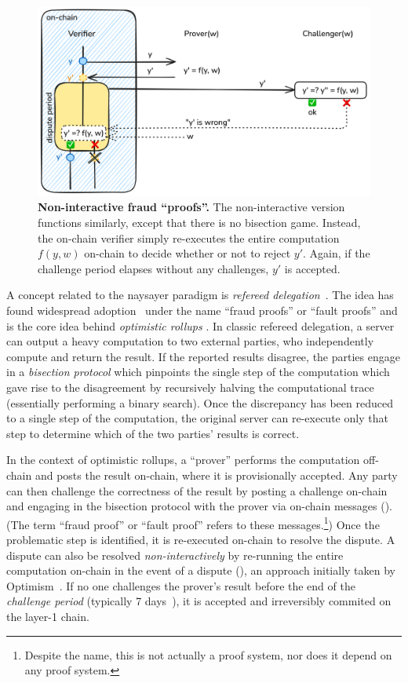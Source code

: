  \begin{figure}[tbh]
    \includegraphics[width=\textwidth]{naysayer/figs/fraud-NI.png}
    \caption{\textbf{Non-interactive fraud ``proofs''.} The non-interactive version functions similarly, except that there is no bisection game. Instead, the on-chain verifier simply re-executes the entire computation $f(y, w)$ on-chain to decide whether or not to reject $y'$. Again, if the challenge period elapses without any challenges, $y'$ is accepted.}
    \label{fig:fraud-NI}
 \end{figure}

A concept related to the naysayer paradigm is \emph{refereed delegation}~\cite{STOC:FeiKil97}. The idea has found widespread adoption~\cite{ARXIV:TeuRei19,USENIX:KGCWF18} under the name ``fraud proofs'' or ``fault proofs'' and is the core idea behind \emph{optimistic rollups} \cite{ethereum_optimistic,arbitrum_nitro,optimism_rollup}. In classic refereed delegation, a server can output a heavy computation to two external parties, who independently compute and return the result. If the reported results disagree, the parties engage in a \emph{bisection protocol} which pinpoints the single step of the computation which gave rise to the disagreement by recursively halving the computational trace (essentially performing a binary search). Once the discrepancy has been reduced to a single step of the computation, the original server can re-execute only that step to determine which of the two parties' results is correct. 

In the context of optimistic rollups, a ``prover'' performs the computation off-chain and posts the result on-chain, where it is provisionally accepted. Any party can then challenge the correctness of the result by posting a challenge on-chain and engaging in the bisection protocol with the prover via on-chain messages (). (The term ``fraud proof'' or ``fault proof'' refers to these messages.\footnote{Despite the name, this is not actually a proof system, nor does it depend on any proof system.}) Once the problematic step is identified, it is re-executed on-chain to resolve the dispute. A dispute can also be resolved \emph{non-interactively} by re-running the entire computation on-chain in the event of a dispute (), an approach initially taken by Optimism~\cite{optimism_v1,buckland_fraudproofs}.
If no one challenges the prover's result before the end of the \emph{challenge period} (typically 7 days~\cite{why7days}), it is accepted and irreversibly commited on the layer-1 chain.

